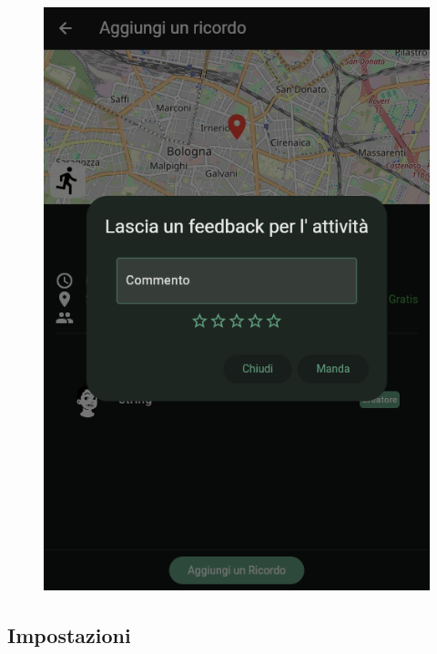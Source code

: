 \documentclass[a4paper,12pt]{article}
\begin{document}
\begin{figure}[H]
\begin{minipage}{0.32\textwidth}
        \includegraphics[width=1\linewidth]{img/add_feedback.png}
    \end{minipage}
\end{figure}


\newpage
\subsection{Impostazioni}
\end{document}
